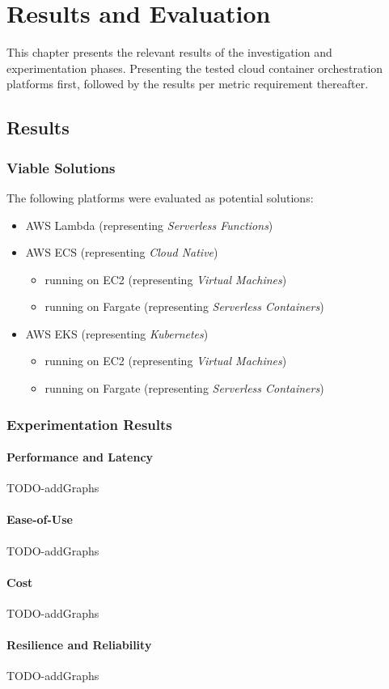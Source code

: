 \part{Results and Evaluation}

This chapter presents the relevant results of the investigation and experimentation phases.
Presenting the tested cloud container orchestration platforms first,
followed by the results per metric requirement thereafter.

\chapter{Results}

\section{Viable Solutions}
The following platforms were evaluated as potential solutions:
\begin{itemize}
  \item AWS Lambda (representing \textit{Serverless Functions})
  \item AWS ECS (representing \textit{Cloud Native})
        \begin{itemize}
          \item running on EC2 (representing \textit{Virtual Machines})
          \item running on Fargate (representing \textit{Serverless Containers})
        \end{itemize}
  \item AWS EKS (representing \textit{Kubernetes})
        \begin{itemize}
          \item running on EC2 (representing \textit{Virtual Machines})
          \item running on Fargate (representing \textit{Serverless Containers})
        \end{itemize}
\end{itemize}

\section{Experimentation Results}

\subsection{Performance and Latency}
TODO-addGraphs
\subsection{Ease-of-Use}
TODO-addGraphs
\subsection{Cost}
TODO-addGraphs
\subsection{Resilience and Reliability}
TODO-addGraphs
